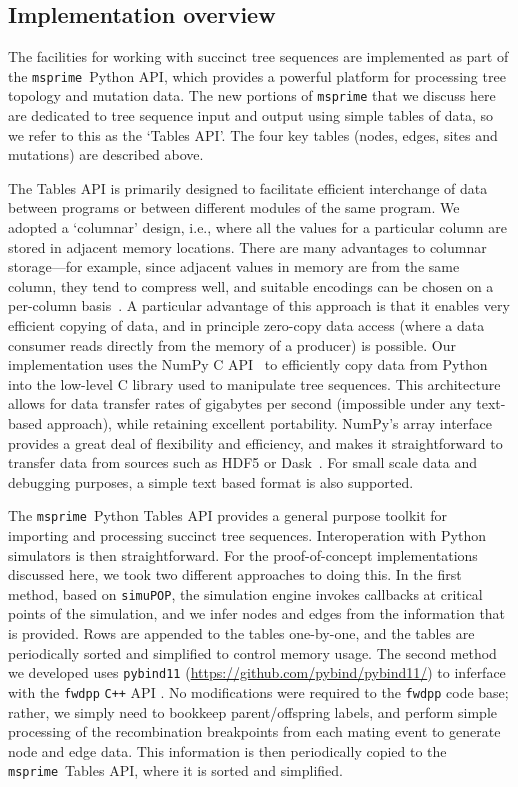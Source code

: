 \documentclass{article}
\newcommand{\simupop}{\texttt{simuPOP}}
\newcommand{\fwdpp}{\texttt{fwdpp}}
\newcommand{\cpp}{\texttt{C++}}
\newcommand{\msprime}{\texttt{msprime}}
\begin{document}
\subsection*{Implementation overview}

The facilities for working with succinct tree sequences are implemented as part
of the \msprime\ Python API, which provides a powerful platform for processing
tree topology and mutation data. The new portions of \msprime{} that we discuss
here are dedicated to tree sequence input and output using simple tables of
data, so we refer to this as the `Tables API'. The four key tables (nodes,
edges, sites and mutations) are described above.

The Tables API is primarily designed to facilitate efficient interchange of
data between programs or between different modules of the same program. We
adopted a `columnar' design, i.e., where all the values for a
particular column are stored in adjacent memory locations.
There are many advantages to columnar storage---for example, since adjacent
values in memory are from the same column, they tend to compress well,
and suitable encodings can be chosen on a per-column basis~\citep{abadi2006integrating}.
A particular advantage of this approach is that it enables very
efficient copying of data, and in principle zero-copy data access
(where a data consumer reads directly from the memory of a producer) is possible.
Our implementation uses the NumPy C API~\citep{walt2011numpy} to efficiently copy
data from Python into the low-level C library used to manipulate tree sequences.
This architecture allows for data transfer rates of gigabytes per second
(impossible under any text-based approach), while retaining excellent portability.
NumPy's array interface provides a great deal of flexibility and efficiency,
and makes it straightforward to transfer data from sources
such as HDF5 \citep{hdf5}or Dask~\citep{dask}.
For small scale data and debugging purposes, a simple text based format is also supported.

The \msprime\ Python Tables API provides a general purpose toolkit for importing
and processing succinct tree sequences. Interoperation with Python simulators
is then straightforward. For the proof-of-concept implementations discussed
here, we took two different approaches to doing this. In the first method,
based on \simupop{}, the simulation engine invokes callbacks at critical points
of the simulation, and we infer nodes and edges from the information that is
provided. Rows are appended to the tables one-by-one, and the tables are
periodically sorted and simplified to control memory usage. The second method we developed uses
\texttt{pybind11} (\url{https://github.com/pybind/pybind11/}) to inferface
with the \fwdpp{} \cpp{} API \citep{fwdpp}. No modifications were
required to the \fwdpp{} code base; rather, we simply need to bookkeep parent/offspring labels,
and perform simple processing of the recombination breakpoints from each mating
event to generate node and edge data. This information is then periodically copied
to the \msprime\ Tables API, where it is sorted and simplified.
\end{document}
